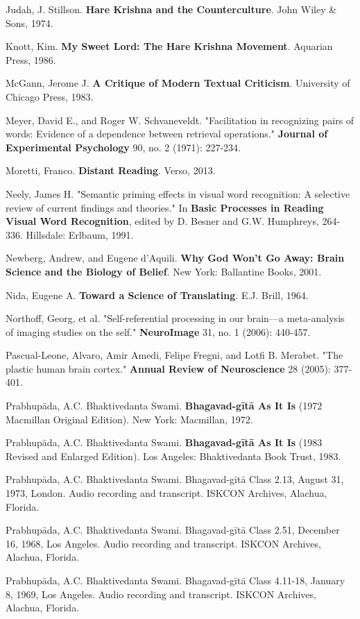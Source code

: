 \documentclass[11pt,twoside]{book}
\begin{document}
Judah, J. Stillson. \textbf{Hare Krishna and the Counterculture}. John Wiley \& Sons, 1974.

Knott, Kim. \textbf{My Sweet Lord: The Hare Krishna Movement}. Aquarian Press, 1986.

McGann, Jerome J. \textbf{A Critique of Modern Textual Criticism}. University of Chicago Press, 1983.

Meyer, David E., and Roger W. Schvaneveldt. "Facilitation in recognizing pairs of words: Evidence of a dependence between retrieval operations." \textbf{Journal of Experimental Psychology} 90, no. 2 (1971): 227-234.

Moretti, Franco. \textbf{Distant Reading}. Verso, 2013.

Neely, James H. "Semantic priming effects in visual word recognition: A selective review of current findings and theories." In \textbf{Basic Processes in Reading Visual Word Recognition}, edited by D. Besner and G.W. Humphreys, 264-336. Hillsdale: Erlbaum, 1991.

Newberg, Andrew, and Eugene d'Aquili. \textbf{Why God Won't Go Away: Brain Science and the Biology of Belief}. New York: Ballantine Books, 2001.

Nida, Eugene A. \textbf{Toward a Science of Translating}. E.J. Brill, 1964.

Northoff, Georg, et al. "Self-referential processing in our brain—a meta-analysis of imaging studies on the self." \textbf{NeuroImage} 31, no. 1 (2006): 440-457.

Pascual-Leone, Alvaro, Amir Amedi, Felipe Fregni, and Lotfi B. Merabet. "The plastic human brain cortex." \textbf{Annual Review of Neuroscience} 28 (2005): 377-401.

Prabhupāda, A.C. Bhaktivedanta Swami. \textbf{Bhagavad-gītā As It Is} (1972 Macmillan Original Edition). New York: Macmillan, 1972.

Prabhupāda, A.C. Bhaktivedanta Swami. \textbf{Bhagavad-gītā As It Is} (1983 Revised and Enlarged Edition). Los Angeles: Bhaktivedanta Book Trust, 1983.

Prabhupāda, A.C. Bhaktivedanta Swami. Bhagavad-gītā Class 2.13, August 31, 1973, London. Audio recording and transcript. ISKCON Archives, Alachua, Florida.

Prabhupāda, A.C. Bhaktivedanta Swami. Bhagavad-gītā Class 2.51, December 16, 1968, Los Angeles. Audio recording and transcript. ISKCON Archives, Alachua, Florida.

Prabhupāda, A.C. Bhaktivedanta Swami. Bhagavad-gītā Class 4.11-18, January 8, 1969, Los Angeles. Audio recording and transcript. ISKCON Archives, Alachua, Florida.
\end{document}

